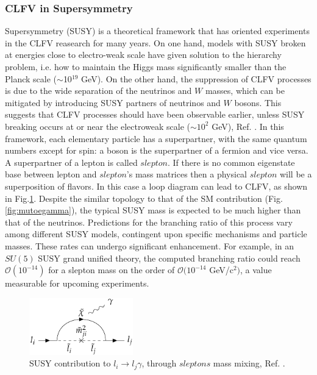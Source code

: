 \subsubsection{CLFV in Supersymmetry}\label{susy}
Supersymmetry (SUSY) is a theoretical framework that has oriented experiments in the CLFV reasearch for many years. On one hand, models with SUSY broken at energies close to electro-weak scale have given solution to the hierarchy problem, i.e. how to maintain the Higgs mass significantly smaller than the Planck scale ($\sim$10$^{19}$ GeV). On the other hand, the suppression of CLFV processes is due to the wide separation of the neutrinos and $W$ masses, which can be mitigated by introducing SUSY partners of neutrinos and $W$ bosons. This suggests that CLFV processes should have been observable earlier, unless SUSY breaking occurs at or near the electroweak scale ($\sim 10^2$ GeV), Ref. \cite{clfv_signorelli}. In this framework, each elementary particle has a superpartner,  with the same quantum numbers except for spin: a boson is the superpartner of a fermion and vice versa. A superpartner of a lepton is called $slepton$. If there is no common eigenstate base between lepton and $slepton$'s mass matrices then a physical $slepton$ will be a superposition of flavors. In this case a loop diagram can lead to CLFV, as shown in Fig.\ref{fig:susy}. Despite the similar topology to that of the SM contribution (Fig.\ref{fig:mutoegamma}), the typical SUSY mass is expected to be much higher than that of the neutrinos. Predictions for the branching ratio of this process vary among different SUSY models, contingent upon specific mechanisms and particle masses. These rates can undergo significant enhancement. For example, in an $SU(5)$ SUSY grand unified theory, the computed branching ratio could reach $\mathcal{O}(10^{-14})$ for a slepton mass on the order of $\mathcal{O}(10^{-14}$ GeV/c$^2)$, a value measurable for upcoming experiments.

\begin{figure}[!h]
\centering
\includegraphics[width =0.4\textwidth]{figures/png/Screenshot_20240218_105920.png}
\caption{SUSY contribution to $l_i \rightarrow l_j\gamma$, through $sleptons$ mass mixing, Ref. \cite{universe8060299}.}
\label{fig:susy}
\end{figure}


